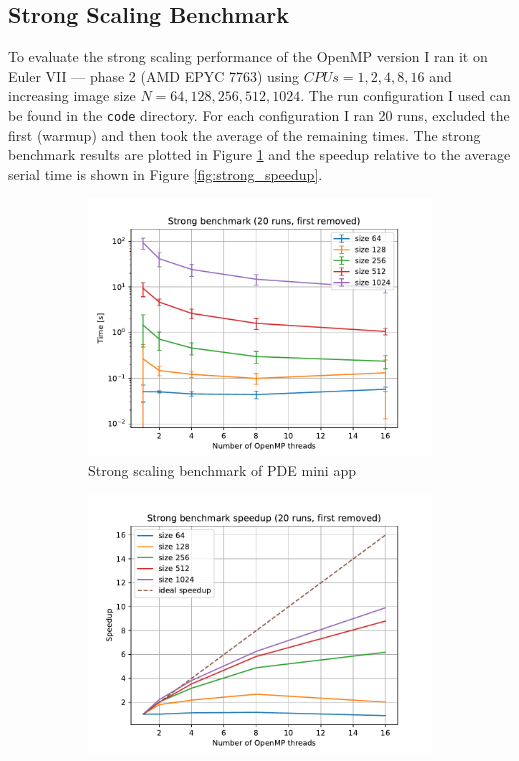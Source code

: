 \documentclass[unicode,11pt,a4paper,oneside,numbers=endperiod,openany]{scrartcl}
\begin{document}
\subsection{Strong Scaling Benchmark}

To evaluate the strong scaling performance of the OpenMP version I ran it on Euler VII — phase 2 (AMD EPYC 7763) using $CPUs=1,2,4,8,16$ and increasing image size $N=64,128,256,512,1024$. The run configuration I used can be found in the \texttt{code} directory. For each configuration I ran 20 runs, excluded the first (warmup) and then took the average of the remaining times. The strong benchmark results are plotted in Figure \ref{fig:strong_scaling} and the speedup relative to the average serial time is shown in Figure \ref{fig:strong_speedup}.

\begin{figure}[h!t]
    \begin{subfigure}{.5\textwidth}
        \includegraphics[width=\textwidth]{plots/strong_scaling.pdf}
        \caption{Strong scaling benchmark of PDE mini app}
        \label{fig:strong_scaling}
    \end{subfigure}
    \begin{subfigure}{.5\textwidth}
        \includegraphics[width=\textwidth]{plots/strong_speedup.pdf}

\end{subfigure}
\end{figure}
\end{document}
